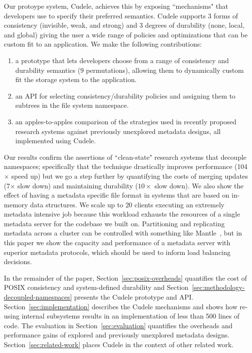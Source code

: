 Our protoype system, Cudele, achieves this by exposing ``mechanisms" that
developers use to specify their preferred semantics.  Cudele supports 3 forms
of consistency (invisible, weak, and strong) and 3 degrees of durability (none,
local, and global) giving the user a wide range of policies and optimizations
that can be custom fit to an application. We make the following contributions:

\begin{enumerate}

  \item a prototype that lets developers choose from a range of
  consistency and durability semantics (9 permutations), allowing them to dynamically custom
  fit the storage system to the application.

  \item an API for selecting consistency/durability policies and assigning
  them to subtrees in the file system namespace.

  \item an apples-to-apples comparison of the strategies used in recently proposed research systems against
  previously unexplored metadata designs, all implemented using Cudele.

\end{enumerate}

Our results confirm the assertions of ``clean-state" research systems that
decouple namespaces; specifically that the technique drastically improves
performance (104\(\times\) speed up) but we go a step further by quantifying
the costs of merging updates (7\(\times\) slow down) and maintaining durability
(\(10\times\) slow down). We also show the effect of having a metadata specific
file format in systems that are based on in-memory data structures.  We scale
up to 20 clients executing an extremely metadata intensive job because this
workload exhausts the resources of a single metadata server for the codebase we
built on.  Partitioning and replicating metadata across a cluster can be
controlled with something like Mantle~\cite{sevilla:sc15-mantle}, but in this
paper we show the capacity and performance of a metadata server with superior
metadata protocols, which should be used to inform load balancing decisions.

In the remainder of the paper, Section~\ref{sec:posix-overheads} quantifies the
cost of POSIX consistency and system-defined durability and
Section~\ref{sec:methodology-decoupled-namespaces} presents the Cudele
prototype and API. Section~\ref{sec:implementation} describes the Cudele
mechanisms and shows how re-using internal subsystems results in an
implementation of less than 500 lines of code. The evaluation in
Section~\ref{sec:evaluation} quantifies the overheads and performance gains of
explored and previously unexplored metadata designs.
Section~\ref{sec:related-work} places Cudele in the context of other related
work.

